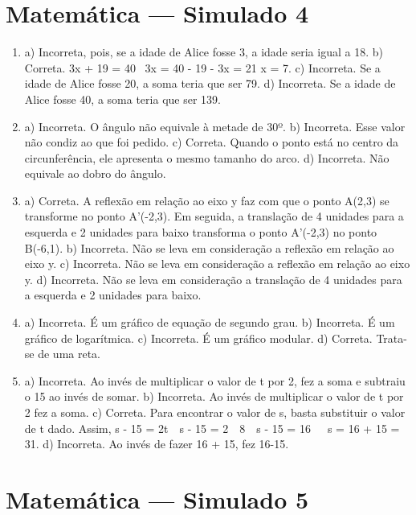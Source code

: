 \section*{Matemática — Simulado 4}

\begin{enumerate}
\item a) Incorreta, pois, se a idade de Alice fosse 3, a idade seria igual a 18.
b) Correta.
3x + 19 = 40 \Rightarrow \ 3x = 40 - 19 - \Rightarrow 3x = 21 \Rightarrow x = 7.
c) Incorreta. Se a idade de Alice fosse 20, a soma teria que ser 79.
d) Incorreta. Se a idade de Alice fosse 40, a soma teria que ser 139.


\item a) Incorreta. O ângulo não equivale à metade de 30º.
b) Incorreta. Esse valor não condiz ao que foi pedido.
c) Correta. Quando o ponto está no centro da circunferência, ele apresenta o mesmo tamanho do arco.
d) Incorreta. Não equivale ao dobro do ângulo.


\item a) Correta. A reflexão em relação ao eixo y faz com que o ponto
A(2,3) se transforme no ponto A'(-2,3). Em seguida, a translação de 4 unidades para a esquerda e 2 unidades para baixo transforma o ponto A'(-2,3) no ponto B(-6,1).
b) Incorreta. Não se leva em consideração a reflexão em relação ao eixo y.
c) Incorreta. Não se leva em consideração a reflexão em relação ao eixo y.
d) Incorreta. Não se leva em consideração a translação de 4 unidades para a esquerda e 2 unidades para baixo.


\item a) Incorreta. É um gráfico de equação de segundo grau.
b) Incorreta. É um gráfico de logarítmica.
c) Incorreta. É um gráfico modular.
d) Correta. Trata-se de uma reta.


\item a) Incorreta. Ao invés de multiplicar o valor de t por 2, fez a soma e subtraiu o 15 ao invés de somar.
b) Incorreta. Ao invés de multiplicar o valor de t por 2 fez a soma.
c) Correta. Para encontrar o valor de s, basta substituir o valor de t dado. Assim, s - 15 = 2t\  \rightarrow \ s - 15 = 2\  \times \ 8\  \rightarrow \ s - 15 = 16\  \rightarrow \ \ s = 16 + 15 = 31.
d) Incorreta. Ao invés de fazer 16 + 15, fez 16-15.
\end{enumerate}

\section*{Matemática — Simulado 5} 

